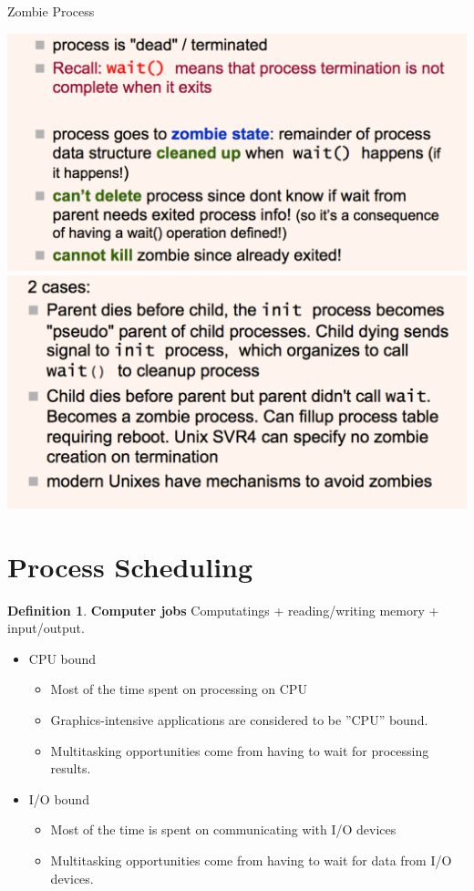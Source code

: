 \documentclass[12pt,a4paper]{article}
\theoremstyle{definition}
\newtheorem{definition}{Definition}[section]
\newenvironment{myitemize}
{ \begin{itemize}
    \setlength{\itemsep}{5pt}
    \setlength{\parskip}{0pt}
    \setlength{\parsep}{0pt}     }
{ \end{itemize}                  }
\begin{document}
\begin{tcolorbox}
	\textsf{Zombie Process}
	
	\includegraphics[scale=0.30]{m1/zombieProcess1}
	\includegraphics[scale=0.30]{m1/zombieProcess2}
	\centering
\end{tcolorbox}

\section{Process Scheduling}

\begin{definition}{\textbf{Computer jobs}}
	Computatings + reading/writing memory + input/output.
	\begin{myitemize}
		\item CPU bound
		\begin{myitemize}
			\item Most of the time spent on processing on CPU
			\item Graphics-intensive applications are considered to be ''CPU'' bound.
			\item Multitasking opportunities come from having to wait for processing results.
		\end{myitemize}
		\item I/O bound
		\begin{myitemize}
			\item Most of the time is spent on communicating with I/O devices
			\item Multitasking opportunities come from having to wait for data from I/O devices.
		\end{myitemize}
	\end{myitemize}
\end{definition}
\end{document}

